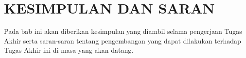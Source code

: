 \chapter{KESIMPULAN DAN SARAN}
Pada bab ini akan diberikan kesimpulan yang diambil selama pengerjaan Tugas Akhir serta saran-saran tentang pengembangan yang dapat dilakukan terhadap Tugas Akhir ini di masa yang akan datang.
